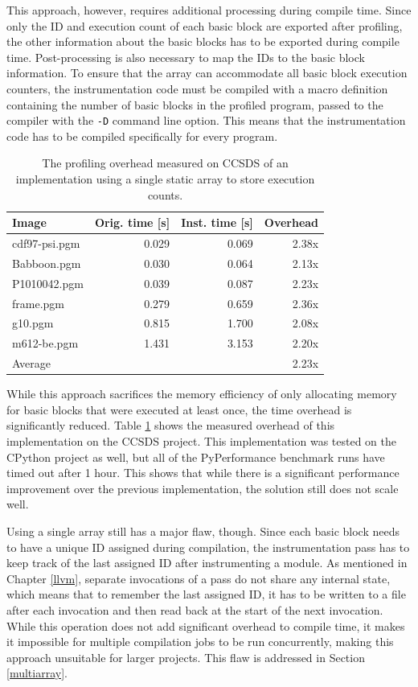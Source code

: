 This approach, however, requires additional processing during compile time. Since only the ID and execution count of each basic block are exported after profiling, the other information about the basic blocks has to be exported during compile time. Post-processing is also necessary to map the IDs to the basic block information.
To ensure that the array can accommodate all basic block execution counters, the instrumentation code must be compiled with a macro definition containing the number of basic blocks in the profiled program, passed to the compiler with the \texttt{-D} command line option. This means that the instrumentation code has to be compiled specifically for every program.

\begin{table}[]
    \centering
    \begin{tabular}{lrrr}
    \textbf{Image} & \textbf{Orig. time [s]} & \textbf{Inst. time [s]} & \textbf{Overhead}  \\ 
    \hline
    \hline
    cdf97-psi.pgm &  0.029 & 0.069 & 2.38x \\
    Babboon.pgm & 0.030 & 0.064 & 2.13x \\
    P1010042.pgm & 0.039 & 0.087 & 2.23x \\
    frame.pgm & 0.279 & 0.659 & 2.36x \\
    g10.pgm & 0.815 & 1.700 & 2.08x \\
    m612-be.pgm & 1.431 & 3.153 & 2.20x \\ \hline
    Average & & & 2.23x
    \end{tabular}
    \caption{The profiling overhead measured on CCSDS of an implementation using a single static array to store execution counts.}
    \label{tab:single-array-ccsds}
\end{table}

While this approach sacrifices the memory efficiency of only allocating memory for basic blocks that were executed at least once, the time overhead is significantly reduced. Table \ref{tab:single-array-ccsds} shows the measured overhead of this implementation on the CCSDS project. This implementation was tested on the CPython project as well, but all of the PyPerformance benchmark runs have timed out after 1 hour. This shows that while there is a significant performance improvement over the previous implementation, the solution still does not scale well.

Using a single array still has a major flaw, though. Since each basic block needs to have a unique ID assigned during compilation, the instrumentation pass has to keep track of the last assigned ID after instrumenting a module. As mentioned in Chapter \ref{llvm}, separate invocations of a pass do not share any internal state, which means that to remember the last assigned ID, it has to be written to a file after each invocation and then read back at the start of the next invocation. While this operation does not add significant overhead to compile time, it makes it impossible for multiple compilation jobs to be run concurrently, making this approach unsuitable for larger projects. This flaw is addressed in Section \ref{multiarray}.

